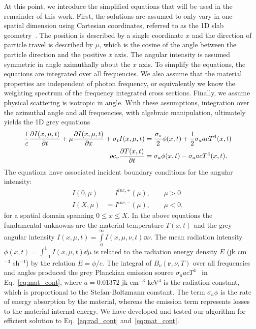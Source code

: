 At this point, we introduce the simplified equations that will be used in the remainder of
this work.  First, the solutions are assumed to only vary in one spatial dimension using
Cartesian coordinates, referred to as the 1D slab geometry~\cite{lewis}.   The
position is described by a single coordinate $x$ and the direction of particle travel
is described by $\mu$, which is the cosine of the angle between the particle direction and the
positive $x$ axis. The angular
intensity is assumed symmetric in angle azimuthally about the $x$ axis.  
To
simplify the equations, the equations are integrated over all frequencies.  We also assume that the material properties are independent of photon frequency, or
equivalently we know the weighting spectrum of the frequency integrated cross sections.   Finally, we assume physical scattering
is isotropic in angle. With these assumptions, integration over the azimuthal angle and
all frequencies, with algebraic manipulation, ultimately yields the 1D grey equations~\cite{wollaber_thesis,mihalas}
\begin{align}\label{eq:rad_cont}
    \frac{1}{c}\frac{\partial I(x,\mu,t)}{\partial t} + \mu \frac{\partial I(x,\mu,t)}{\partial x} + \sigma_t
    I(x,\mu,t)
&= \frac{\sigma_s}{2} \phi(x,t) +\frac{1}{2} \sigma_a a c T^4(x,t)
    \\ \label{eq:mat_cont}
  \rho c_v \frac{\partial T(x,t)}{\partial t} &=  \sigma_a \phi(x,t) - \sigma_a a c T^4(x,t).
\end{align}
The equations have associated incident boundary conditions for the angular intensity:
\begin{align}
    I(0,\mu) &= I^{inc,+}(\mu),\quad\quad \mu>0 \\
    I(X,\mu) &= I^{inc,-}(\mu), \quad\quad \mu<0,
\end{align}
for a spatial domain spanning $0\leq x \leq X$.
In the above equations the fundamental unknowns are the material temperature $T(x,t)$ and
the grey angular intensity $I(x,\mu,t)=\int\limits_0^\infty I(x,\mu,\nu,t) \dd \nu$. The mean radiation intensity $\phi(x,t)=\int_{-1}^1
I(x,\mu,t) \dd \mu$ is related to the radiation energy density
$E$ (jk cm$^{-3}$ sh$^{-1}$) by the relation $E = \phi/c$.  The integral of
$B_\nu(\mathbf{r},\nu,T)$ over all frequencies and angles produced the 
grey Planckian emission source $\sigma_a a c T^4$~\cite{mihalas} in
Eq.~\eqref{eq:mat_cont}, where $a=0.01372$ jk cm$^{-3}$
keV$^{4}$ is the radiation constant, which is proportional to the Stefan-Boltzmann
constant.  The term $\sigma_a \phi$ is the rate of energy absorption by the material,
whereas the emission term represents losses to the material internal energy.  We have developed
and tested our algorithm for efficient solution to Eq.~\eqref{eq:rad_cont}
and~\eqref{eq:mat_cont}.


